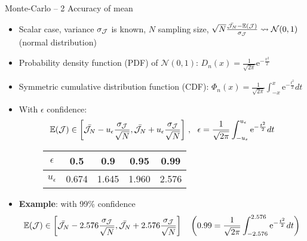 \documentclass[10pt]{beamer}
\def\vt{\vspace{2mm}}
\def\begit{\begin{itemize}}
\def\endit{\end{itemize}}
\newcommand{\iexp}{\mathrm{e}}
\newcommand{\esp}{{\mathbb E}}
\newcommand{\PDFN}{{\mathcal N}}
\begin{document}
\begin{frame}{Monte-Carlo -- 2 }{Accuracy of mean} 

\begit
\item Scalar case, variance $\sigma_{\cal J}$ is known, $N$ sampling size, $\sqrt{N} \frac{\bar{{\cal J}_N}-\esp({\cal J})}{\sigma_{\cal J}} \leadsto \PDFN(0,1)$ (normal distribution) 
\vt
 \item  Probability density function (PDF) of $\PDFN(0,1)$: $D_n(x)=\frac{1}{\sqrt{2\pi}} \iexp^{-\frac{x^2}{2}}$
 \item  Symmetric cumulative distribution function (CDF): $\Phi_n(x)=\frac{1}{\sqrt{2\pi}}\int_{-x}^x \iexp^{-\frac{t^2}{2}}dt$
%  
\item With $\epsilon$ confidence:
 $$ \esp({\cal J}) \in \left[ \bar{{\cal J}_N}-u_{\epsilon}\frac{\sigma_{{\cal J}}}{\sqrt{N}},
                   \bar{{\cal J}_N}+u_{\epsilon}\frac{\sigma_{{\cal J}}}{\sqrt{N}} \right]\,, ~~
   \epsilon = \frac{1}{\sqrt{2\pi}}\displaystyle\int_{-u_\epsilon}^{u_\epsilon} \iexp^{-\frac{t^2}{2}}dt$$

\begin{figure}
\begin{center}
\begin{tabular}{|c|c|c|c|c|}
\hline
$\epsilon$ & 0.5 & 0.9 & 0.95 & 0.99\\
\hline
$u_{\epsilon}$ & 0.674 & 1.645 & 1.960 & 2.576 \\
\hline
\end{tabular}
\end{center}
\end{figure}
%
\vt
\item {\bf Example}: with 99\% confidence
%   
  $$ \esp({\cal J}) \in\left[ \bar{{\cal J}_N}-2.576\frac{\sigma_{{\cal J}}}{\sqrt{N}},
                   \bar{{\cal J}_N}+2.576\frac{\sigma_{{\cal J}}}{\sqrt{N}} \right]\quad
   \left(0.99=\frac{1}{\sqrt{2\pi}}\displaystyle\int_{-2.576}^{2.576} \iexp^{-\frac{t^2}{2}}dt\right) $$
\endit
%
\end{frame} 
%
%
\end{document}
